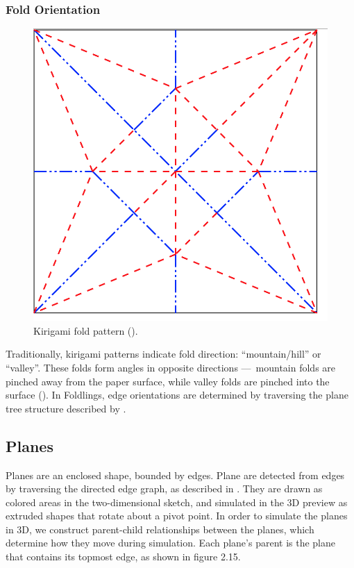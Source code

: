 \subsubsection{Fold Orientation}\label{fold-orientation}

\begin{figure}[htbp]
\centering
\includegraphics{figures/33_UI_Interface_Data_Structures/maekawas-theorem.png}
\caption{Kirigami fold pattern (\citet{maekawas-theorem}).}
\end{figure}

Traditionally, kirigami patterns indicate fold direction:
``mountain/hill'' or ``valley''. These folds form angles in opposite
directions ---~mountain folds are pinched away from the paper surface,
while valley folds are pinched into the surface
(\citet{chatani_pop-up_1986}). In Foldlings, edge orientations are
determined by traversing the plane tree structure described by
\citet{mallen}.

\subsection{Planes}\label{planes}

Planes are an enclosed shape, bounded by edges. Plane are detected from
edges by traversing the directed edge graph, as described in
\citet{mallen}. They are drawn as colored areas in the two-dimensional
sketch, and simulated in the 3D preview as extruded shapes that rotate
about a pivot point. In order to simulate the planes in 3D, we construct
parent-child relationships between the planes, which determine how they
move during simulation. Each plane's parent is the plane that contains
its topmost edge, as shown in figure 2.15.

